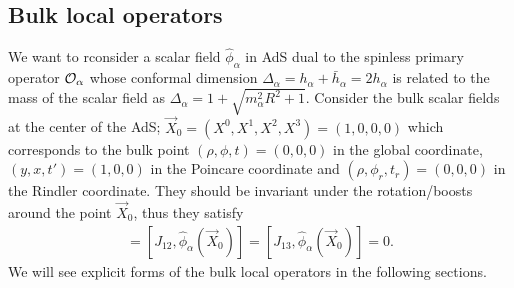 \documentclass[11pt,a4paper]{article}
\def\a{{\alpha}}
\def\s{\sqrt}
\def\CO{{\cal O}}
\def\ba{\begin{eqnarray}}
\def\ea{\end{eqnarray}}
\begin{document}
\subsection{Bulk local operators}
We want to rconsider a scalar field $\hat{\phi}_\a$ in AdS dual to the spinless primary operator
$\CO_\a$ whose conformal dimension  $\Delta_\a=h_\a+\bar{h}_\a=2h_\a$ is related to the mass of the scalar field as $
\Delta_\a=1+\s{m^2_\a R^2+1}
$. Consider the bulk scalar fields at the center of the AdS; $\vec{X}_0=(X^0,X^1,X^2,X^3)=(1,0,0,0)$ which corresponds to the bulk point $(\rho,\phi,t)=(0,0,0)$ in the global coordinate, $(y,x,t')=(1,0,0)$ in the Poincare coordinate and $(\rho,\phi_r,t_r)=(0,0,0)$ in the Rindler coordinate.
 They should be invariant under the rotation/boosts around the point $\vec{X}_0$, thus they satisfy
 \ba
[L_{23},\hat{\phi}_\a(\vec{X}_0)]=[J_{12},\hat{\phi}_\a(\vec{X}_0)]=[J_{13},\hat{\phi}_\a(\vec{X}_0)]=0.\label{bls}
\ea
We will see explicit forms of the bulk local operators in the following sections.
\end{document}

